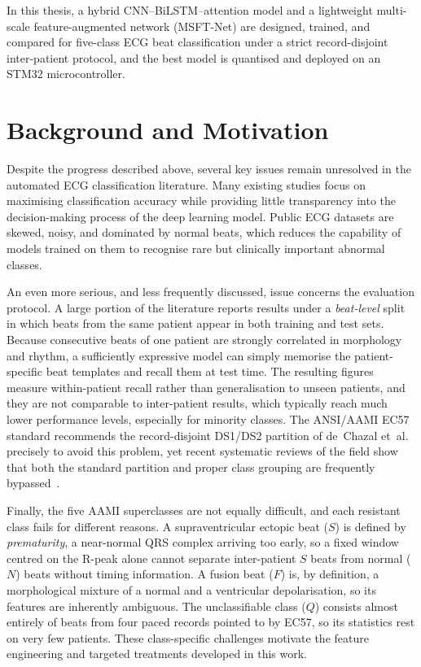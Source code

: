 In this thesis, a hybrid CNN--BiLSTM--attention model and a lightweight
multi-scale feature-augmented network (MSFT-Net) are designed, trained, and
compared for five-class ECG beat classification under a strict
record-disjoint inter-patient protocol, and the best model is quantised and
deployed on an STM32 microcontroller.


\section{Background and Motivation}
\label{sec:background}

Despite the progress described above, several key issues remain unresolved
in the automated ECG classification literature. Many existing studies focus
on maximising classification accuracy while providing little transparency
into the decision-making process of the deep learning model. Public ECG
datasets are skewed, noisy, and dominated by normal beats, which reduces the
capability of models trained on them to recognise rare but clinically
important abnormal classes.

An even more serious, and less frequently discussed, issue concerns the
evaluation protocol. A large portion of the literature reports results under
a \emph{beat-level} split in which beats from the same patient appear in
both training and test sets. Because consecutive beats of one patient are
strongly correlated in morphology and rhythm, a sufficiently expressive
model can simply memorise the patient-specific beat templates and recall
them at test time. The resulting figures measure within-patient recall
rather than generalisation to unseen patients, and they are not comparable
to inter-patient results, which typically reach much lower performance
levels, especially for minority classes. The ANSI/AAMI EC57 standard
recommends the record-disjoint DS1/DS2 partition of de~Chazal
et~al.~\cite{dechazal2004} precisely to avoid this problem, yet recent
systematic reviews of the field show that both the standard partition and
proper class grouping are frequently bypassed~\cite{silva2025systematic,xiao2023systematic}.

Finally, the five AAMI superclasses are not equally difficult, and each
resistant class fails for different reasons. A supraventricular ectopic beat
($S$) is defined by \emph{prematurity}, a near-normal QRS complex arriving
too early, so a fixed window centred on the R-peak alone cannot separate
inter-patient $S$ beats from normal ($N$) beats without timing information.
A fusion beat ($F$) is, by definition, a morphological mixture of a normal
and a ventricular depolarisation, so its features are inherently ambiguous.
The unclassifiable class ($Q$) consists almost entirely of beats from four
paced records pointed to by EC57, so its statistics rest on very few
patients. These class-specific challenges motivate the feature engineering
and targeted treatments developed in this work.

